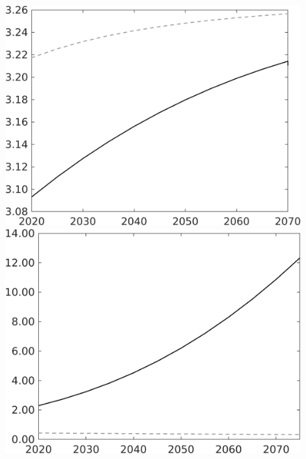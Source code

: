 \documentclass[12pt]{article}
\begin{document}
\begin{figure}
\begin{minipage}[]{0.32\textwidth}
	\end{minipage}
	\begin{minipage}[]{0.32\textwidth}
		\includegraphics[width=1\textwidth]{../../codding_model/own_basedOnFried/optimalPol_010922_revision/figures/all_13Sept22/LevTaufNoTauf_TaulCalib_Equlab_regime0_gAn_spillover0_nsk1_xgr0_knspil1_sep1_LFlimit0_emsbase0_countec0_GovRev0_etaa0.79_lgd0.png}
	\end{minipage}
	\begin{minipage}[]{0.32\textwidth}
		\includegraphics[width=1\textwidth]{../../codding_model/own_basedOnFried/optimalPol_010922_revision/figures/all_13Sept22/LevTaufNoTauf_TaulCalib_Equlab_regime0_LgLf_spillover0_nsk1_xgr0_knspil1_sep1_LFlimit0_emsbase0_countec0_GovRev0_etaa0.79_lgd0.png}

\end{minipage}
\end{figure}
\end{document}
